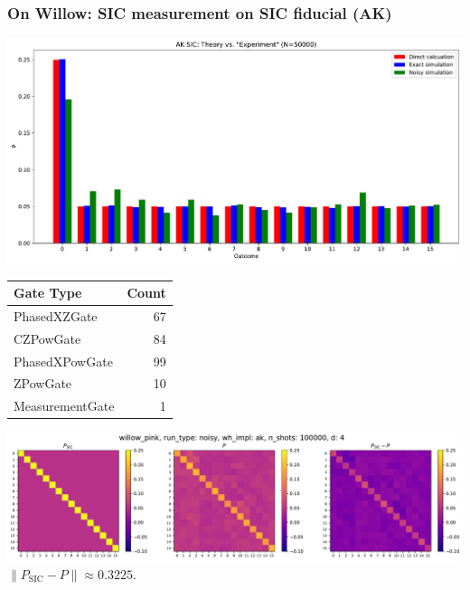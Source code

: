 \documentclass{beamer}
\begin{document}
\begin{frame}
\frametitle{On Willow: SIC measurement on SIC fiducial (AK)}
\begin{center}
\includegraphics[scale=0.34]{img/ak_theory_vs_experiment}	
\end{center}

\begin{tiny}
\begin{table}[h!]
\centering
\begin{tabular}{lr}
\toprule
\textbf{Gate Type} & \textbf{Count} \\
\midrule
PhasedXZGate    & 67 \\
CZPowGate       & 84 \\
PhasedXPowGate  & 99 \\
ZPowGate        & 10 \\
MeasurementGate & 1 \\
\bottomrule
\end{tabular}
\label{tab:circuit_gate_counts}
\end{table}
\end{tiny}
\end{frame}

\begin{frame}
\begin{center}
\includegraphics[scale=0.3]{img/P_noisy_ak_100000}	
$\lVert P_{\text{SIC}}-P\rVert \approx 0.3225$.
\end{center}	
\end{frame}
\end{document}
